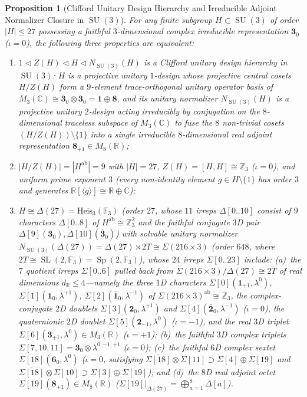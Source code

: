 \documentclass[11pt,a4paper]{article}
\newtheorem{proposition}[theorem]{Proposition}
\theoremstyle{definition}
\theoremstyle{remark}
\newcommand{\R}{\mathbb{R}}
\newcommand{\C}{\mathbb{C}}
\newcommand{\Z}{\mathbb{Z}}
\newcommand{\F}{\mathbb{F}}
\newcommand{\SU}{\operatorname{SU}}
\newcommand{\SL}{\operatorname{SL}}
\begin{document}
\begin{proposition}[Clifford Unitary Design Hierarchy and Irreducible Adjoint Normalizer Closure in {$\SU(3)$}]
\label{prop:su3_operator_basis}
For any finite subgroup $H \subset \SU(3)$ of order $|H| \le 27$ possessing a faithful $3$-dimensional complex irreducible representation $\mathbf{3}_0$ ($\iota = 0$), the following three properties are equivalent:
\begin{enumerate}
    \item $1 \triangleleft Z(H) \triangleleft H \triangleleft N_{\SU(3)}(H)$ is a Clifford unitary design hierarchy in $\SU(3)$: $H$ is a projective unitary $1$-design whose projective central cosets $H/Z(H)$ form a $9$-element trace-orthogonal unitary operator basis of $M_3(\C) \cong \overline{\mathbf{3}}_0 \otimes \mathbf{3}_0 = \mathbf{1} \oplus \mathbf{8}$, and its unitary normalizer $N_{\SU(3)}(H)$ is a projective unitary $2$-design acting irreducibly by conjugation on the $8$-dimensional traceless subspace of $M_3(\C)$ to fuse the $8$ non-trivial cosets $(H/Z(H))\setminus\{1\}$ into a single irreducible $8$-dimensional real adjoint representation $\mathbf{8}_{+1} \in M_8(\R)$;
    \item $|H/Z(H)| = |H^{\mathrm{ab}}| = 9$ with $|H| = 27$, $Z(H) = [H,H] \cong \Z_3$ ($\iota = 0$), and uniform prime exponent $3$ (every non-identity element $g \in H \setminus \{1\}$ has order $3$ and generates $\R[\langle g\rangle] \cong \R \oplus \C$);
    \item $H \cong \Delta(27) = \mathrm{Heis}_3(\F_3)$ (order $27$, whose $11$ irreps $\Delta[0..10]$ consist of $9$ characters $\Delta[0..8]$ of $H^{\mathrm{ab}} \cong \Z_3^2$ and the faithful conjugate $3$D pair $\Delta[9](\mathbf{3}_0), \Delta[10](\overline{\mathbf{3}}_0)$) with solvable unitary normalizer $N_{\SU(3)}(\Delta(27)) = \Delta(27) \rtimes 2T \cong \Sigma(216 \times 3)$ (order $648$, where $2T \cong \SL(2,\F_3) = \operatorname{Sp}(2,\F_3)$), whose $24$ irreps $\Sigma[0..23]$ include: (a)~the $7$ quotient irreps $\Sigma[0..6]$ pulled back from $\Sigma(216 \times 3)/\Delta(27) \cong 2T$ of real dimensions $d_{\R} \le 4$---namely the three $1$D characters $\Sigma[0](\mathbf{1}_{+1}, \lambda^0)$, $\Sigma[1](\mathbf{1}_0, \lambda^{+1})$, $\Sigma[2](\overline{\mathbf{1}}_0, \lambda^{-1})$ of $\Sigma(216 \times 3)^{\mathrm{ab}} \cong \Z_3$, the complex-conjugate $2$D doublets $\Sigma[3](\mathbf{2}_0, \lambda^{+1})$ and $\Sigma[4](\bar{\mathbf{2}}_0, \lambda^{-1})$ ($\iota = 0$), the quaternionic $2$D doublet $\Sigma[5](\mathbf{2}_{-1}, \lambda^0)$ ($\iota = -1$), and the real $3$D triplet $\Sigma[6](\mathbf{3}_{+1}, \lambda^0) \in M_3(\R)$ ($\iota = +1$); (b)~the faithful $3$D complex triplets $\Sigma[7,10,11] = \mathbf{3}_0 \otimes \lambda^{0,-1,+1}$ ($\iota = 0$); (c)~the faithful $6$D complex sextet $\Sigma[18](\mathbf{6}_0, \lambda^0)$ ($\iota = 0$, satisfying $\overline{\Sigma[18]} \otimes \Sigma[11] \supset \Sigma[4] \oplus \Sigma[19]$ and $\overline{\Sigma[18]} \otimes \Sigma[10] \supset \Sigma[3] \oplus \Sigma[19]$); and (d)~the $8$D real adjoint octet $\Sigma[19](\mathbf{8}_{+1}) \in M_8(\R)$ ($\Sigma[19]|_{\Delta(27)} = \bigoplus_{a=1}^8 \Delta[a]$).
\end{enumerate}
\end{proposition}
\end{document}
